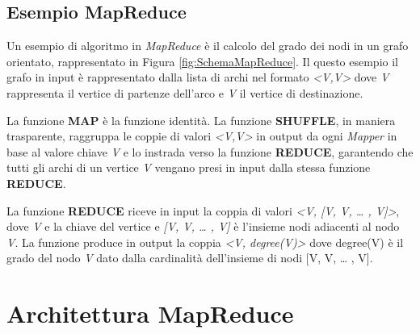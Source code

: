 \documentclass[LaM,binding=0.6cm]{sapthesis}
\begin{document}
\subsection{Esempio MapReduce}

Un esempio di algoritmo in \textit{MapReduce} è il calcolo del grado dei nodi in un grafo orientato, rappresentato in Figura \ref{fig:SchemaMapReduce}. Il questo esempio il grafo in input è rappresentato dalla lista di archi nel formato \textit{<V,V>} dove \textit{V} rappresenta il vertice di partenze dell'arco e \textit{V} il vertice di destinazione.

La funzione \textbf{MAP} è la funzione identità. La funzione \textbf{SHUFFLE}, in maniera trasparente, raggruppa le coppie di valori \textit{<V,V>} in output da ogni \textit{Mapper} in base al valore chiave \textit{V} e lo instrada verso la funzione \textbf{REDUCE}, garantendo che tutti gli archi di un vertice \textit{V} vengano presi in input dalla stessa funzione \textbf{REDUCE}.

La funzione \textbf{REDUCE} riceve in input la coppia di valori \textit{<V, [V, V, … , V]>}, dove \textit{V} e la chiave del vertice  e \textit{[V, V, … , V]} è l'insieme nodi adiacenti al nodo \textit{V}. La funzione produce in output la coppia \textit{<V, degree(V)>} dove degree(V) è il grado del nodo \textit{V} dato dalla cardinalità dell'insieme di nodi [V, V, … , V].
 
\begin{minipage}{\linewidth}

\end{minipage}

\begin{minipage}{\linewidth}

\end{minipage}

\section{Architettura MapReduce}
\end{document}
